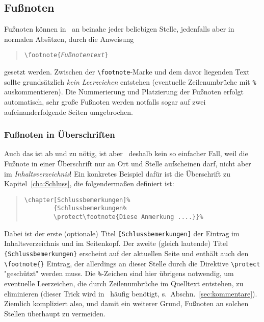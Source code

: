 \subsection{Fußnoten}
Fußnoten können in \latex\ an beinahe jeder beliebigen Stelle, jedenfalls
aber in normalen Absätzen, durch die Anweisung
%
\begin{quote}
    \verb!\footnote{!\texttt{\em Fußnotentext}\verb!}!
\end{quote}
%
gesetzt werden. Zwischen der \verb!\footnote!-Marke und dem davor liegenden
Text sollte grundsätzlich \emph{kein Leerzeichen} entstehen (eventuelle
Zeilen\-um\-brüche mit \verb!%! auskommentieren). Die Nummerierung und
Platzierung der Fußnoten erfolgt automatisch, sehr große Fußnoten werden
notfalls sogar auf zwei aufeinanderfolgende Seiten umgebrochen.

\subsubsection{Fußnoten in Überschriften}

Auch das ist ab und zu nötig, ist aber \va\ deshalb kein so einfacher Fall,
weil die Fußnote in einer Überschrift nur an Ort und Stelle aufscheinen darf,
nicht aber im \emph{Inhaltsverzeichnis}! Ein konkretes Beispiel dafür ist die
Überschrift zu Kapitel~\ref{cha:Schluss}, die folgendermaßen definiert ist:
%
\begin{quote}
    \begin{verbatim}
\chapter[Schlussbemerkungen]%
        {Schlussbemerkungen%
        \protect\footnote{Diese Anmerkung ....}}%
    \end{verbatim}
\end{quote}
%
Dabei ist der erste (optionale) Titel \verb![Schlussbemerkungen]! der Eintrag
im Inhaltsverzeichnis und im Seitenkopf. Der zweite (gleich lautende) Titel
\texttt{\{Schlussbemerkungen\}} erscheint auf der aktuellen Seite und enthält
auch den \verb!\footnote{}! Eintrag, der allerdings an dieser Stelle durch
die Direktive \verb!\protect! "geschützt" werden muss. Die \verb!%!-Zeichen
sind hier übrigens notwendig, um eventuelle Leerzeichen, die durch
Zeilenumbrüche im Quelltext entstehen, zu eliminieren (dieser Trick wird in
\latex\ häufig benötigt, s.\ Abschn.~\ref{sec:kommentare}). Ziemlich
kompliziert also, und damit ein weiterer Grund, Fußnoten an solchen Stellen
überhaupt zu vermeiden.

